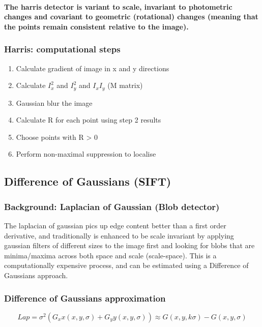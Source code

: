 \documentclass[]{article}
\begin{document}
		\paragraph{The harris detector is variant to scale, invariant to photometric changes and covariant to geometric (rotational) changes (meaning that the points remain consistent relative to the image).}
		
		\subsubsection{Harris: computational steps}
		\begin{enumerate}
			\item Calculate gradient of image in x and y directions
			\item Calculate $I_x^2$ and $I_y^2$ and $I_xI_y$  (M matrix)
			\item Gaussian blur the image
			\item Calculate R for each point using step 2 results
			\item Choose points with R > 0
			\item Perform non-maximal suppression to localise
		\end{enumerate}
	
	\subsection{Difference of Gaussians (SIFT)}
		\subsubsection{Background: Laplacian of Gaussian (Blob detector)}
		\textnormal{The laplacian of gaussian pics up edge content better than a first order derivative, and traditionally is enhanced to be scale invariant by applying gaussian filters of different sizes to the image first and looking for blobs that are minima/maxima across both space and scale (scale-space). This is a computationally expensive process, and can be estimated using a Difference of Gaussians approach.}
		\subsubsection{Difference of Gaussians approximation}
		$$Lap = \sigma^2(G_xx(x,y,\sigma) + G_yy(x,y,\sigma)) \approx G(x,y,k\sigma) - G(x,y,\sigma)$$
\end{document}
